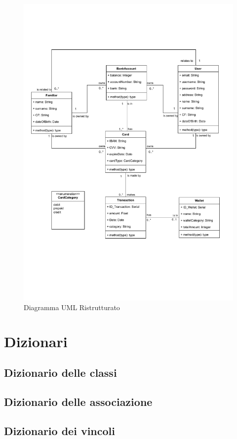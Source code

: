 \begin{figure}[ht!]
    \centering
    \includegraphics[scale=0.7]{pdfs/RestructuredUMLdiagram.drawio.pdf}
    \caption{Diagramma UML Ristrutturato}\label{ResUML}
\end{figure}

\newpage
\section{Dizionari}

\subsection{Dizionario delle classi}

\subsection{Dizionario delle associazione}

\subsection{Dizionario dei vincoli}